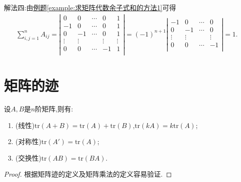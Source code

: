 \documentclass[lang=cn,newtx,10pt,scheme=chinese]{elegantbook}
\begin{document}
\begin{solution}
    {\color{blue}解法四:}由\hyperref[example:求矩阵代数余子式和的方法1]{例题\ref{example:求矩阵代数余子式和的方法1}}可得
    \begin{align*}
        \sum_{i,j=1}^n{A_{ij}}=\left| \begin{matrix}
            0&		0&		\cdots&		0&		1\\
            -1&		0&		\cdots&		0&		1\\
            0&		-1&		\cdots&		0&		1\\
            \vdots&		\vdots&		&		\vdots&		\vdots\\
            0&		0&		\cdots&		-1&		1\\
        \end{matrix} \right|=(-1)^{n+1}\left| \begin{matrix}
            -1&		0&		\cdots&		0\\
            0&		-1&		\cdots&		0\\
            \vdots&		\vdots&		&		\vdots\\
            0&		0&		\cdots&		-1\\
        \end{matrix} \right|=1.
    \end{align*}
\end{solution}

\section{矩阵的迹}

\begin{proposition}[矩阵迹的性质]\label{proposition:矩阵矩阵迹的性质}
设\(A,B\)是\(n\)阶矩阵,则有:
\begin{enumerate}
    \item (线性)\(\mathrm{tr}(A + B)=\mathrm{tr}(A)+\mathrm{tr}(B)\),\(\mathrm{tr}(kA)=k\mathrm{tr}(A)\);
    \item (对称性)\(\mathrm{tr}(A')=\mathrm{tr}(A)\);
    \item (交换性)\(\mathrm{tr}(AB)=\mathrm{tr}(BA)\).
\end{enumerate}
\end{proposition}
\begin{proof}
    根据矩阵迹的定义及矩阵乘法的定义容易验证.
\end{proof}
\end{document}
